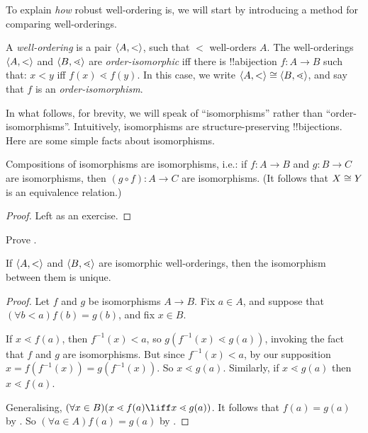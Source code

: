 \documentclass[../../../include/open-logic-section]{subfiles}
\begin{document}

To explain \emph{how} robust well-ordering is, we will start by
introducing a method for comparing well-orderings.

\begin{defn}
A \emph{well-ordering} is a pair $\langle A, < \rangle$, such that $<$
well-orders $A$. The well-orderings $\langle A, < \rangle$ and $\langle B,
\lessdot \rangle$ are \emph{order-isomorphic} {iff} there is !!a{bijection}
$f \colon A \to B$ such that: $x < y$ iff $f(x) \lessdot  f(y)$. In
this case, we write $\langle A, < \rangle \cong \langle B, \lessdot \rangle$, and
say that $f$ is an \emph{order-isomorphism}.
\end{defn}

In what follows, for brevity, we will speak of ``isomorphisms'' rather
than ``order-isomorphisms''. Intuitively, isomorphisms are
structure-preserving !!{bijection}s. Here are some simple facts about
isomorphisms.

\begin{lem}
Compositions of isomorphisms are isomorphisms, i.e.: if $f \colon A
\to B$ and $g \colon B \to C$ are isomorphisms, then $(g \circ f)
\colon A \to C$ are isomorphisms. (It follows that $X \cong Y$ is
an equivalence relation.)
\end{lem}

\begin{proof}
Left as an exercise.
\end{proof}

\begin{prob}
Prove .
\end{prob}

\begin{prop}
If $\langle A, < \rangle$ and $\langle B, \lessdot \rangle$ are isomorphic
well-orderings, then the isomorphism between them is unique.
\end{prop}

\begin{proof}
Let $f$ and $g$ be isomorphisms $A \to B$. 
Fix $a\in A$, and suppose that $(\forall b < a)f(b) = g(b)$, and fix $x \in B$. 

If $x \lessdot f(a)$, then $f^{-1}(x) < a$, so $g(f^{-1}(x) \lessdot
g(a))$, invoking the fact that $f$ and $g$ are isomorphisms. But since
$f^{-1}(x) < a$, by our supposition $x =f(f^{-1}(x)) = g(f^{-1}(x))$.
So $x \lessdot g(a)$. Similarly, if $x \lessdot g(a)$ then $x \lessdot
f(a)$. 

Generalising, $(\forall x \in B)(x \lessdot f(a) \liff x \lessdot
g(a))$. It follows that $f(a) = g(a)$ by
. So $(\forall
a \in A)f(a) = g(a)$ by .
\end{proof}
\end{document}
